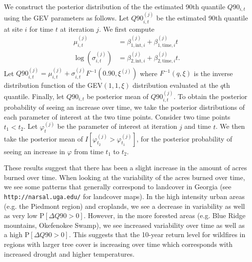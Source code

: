 We construct the posterior distribution of the the estimated 90th quantile $Q90_{i, t}$ using the GEV parameters as follows.
Let $Q90_{i, t}^{(j)}$ be the estimated 90th quantile at site $i$ for time $t$ at iteration $j$.
We first compute
\begin{align}
  \mu_{i, t}^{(j)} &= \beta_{1, \text{int}, i}^{(j)} + \beta_{1, \text{time}, i}^{(j)} t \\
  \log\left(\sigma_{i, t}^{(j)}\right) &= \beta_{2, \text{int}, i}^{(j)} + \beta_{2, \text{time}, i}^{(j)} t. \nonumber
\end{align}
Let $Q90_{i, t}^{(j)} = \mu_{i, t}^{(j)} + \sigma_{i, t}^{(j)} F^{-1}\left(0.90, \xi^{(j)}\right)$ where $F^{-1}(q, \xi)$ is the inverse distribution function of the GEV$(1, 1, \xi)$ distribution evaluated at the $q$th quantile.
Finally, let $Q90_{i, t}$ be posterior mean of $Q90_{i, t}^{(j)}$.
To obtain the posterior probability of seeing an increase over time, we take the posterior distributions of each parameter of interest at the two time points.
Consider two time points $t_1 < t_2$.
Let $\varphi_t^{(j)}$ be the parameter of interest at iteration $j$ and time $t$.
We then take the posterior mean of $I\left[\varphi_{t_2}^{(j)} > \varphi_{t_1}^{(j)}\right]$, for the posterior probability of seeing an increase in $\varphi$ from time $t_1$ to $t_2$.

These results suggest that there has been a slight increase in the amount of acres burned over time.
When looking at the variability of the acres burned over time, we see some patterns that generally correspond to landcover in Georgia (see \texttt{http://narsal.uga.edu/} for landcover maps).
In the high intensity urban areas (e.g. the Piedmont region) and croplands, we see a decrease in variability as well as very low P$[\Delta Q90 > 0]$.
However, in the more forested areas (e.g. Blue Ridge mountains, Okefenokee Swamp), we see increased variability over time as well as a high P$[\Delta Q90 > 0]$.
This suggests that the 10-year return level for wildfires in regions with larger tree cover is increasing over time which corresponds with increased drought and higher temperatures.

